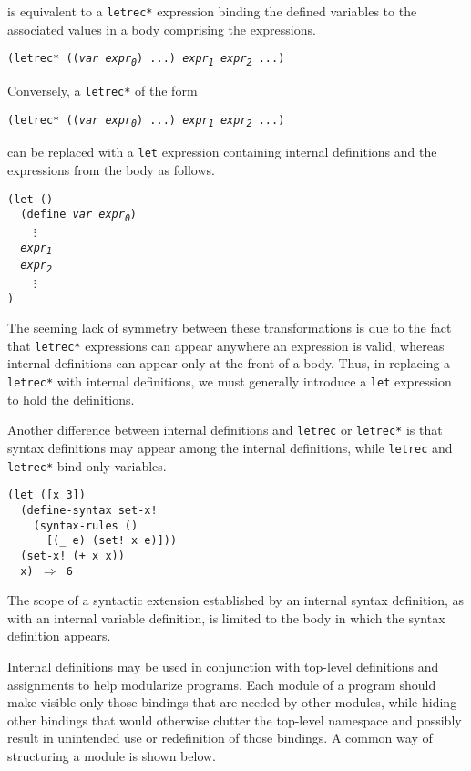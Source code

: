 is equivalent to a \texttt{letrec*}
expression binding the defined variables to the associated values
in a body comprising the expressions.


\texttt{(letrec* ((\textit{var} \textit{expr\textsubscript{0}}) ...) \textit{expr\textsubscript{1}} \textit{expr\textsubscript{2}} ...)}

Conversely, a \texttt{letrec*} of the form


\texttt{(letrec* ((\textit{var} \textit{expr\textsubscript{0}}) ...) \textit{expr\textsubscript{1}} \textit{expr\textsubscript{2}} ...)}

can be replaced with a \texttt{let} expression containing internal definitions
and the expressions from the body as follows.


\begin{alltt}
(let ()
  (define \textit{var} \textit{expr\textsubscript{0}})
    \(\vdots\)
  \textit{expr\textsubscript{1}}
  \textit{expr\textsubscript{2}}
    \(\vdots\)
)
\end{alltt}


The seeming lack of symmetry between these transformations is due to
the fact that \texttt{letrec*} expressions can appear anywhere an expression
is valid, whereas internal definitions can appear only at the front
of a body.
Thus, in replacing a \texttt{letrec*} with internal definitions, we must generally
introduce a \texttt{let} expression to hold the definitions.


Another difference between internal definitions and \texttt{letrec} or
\texttt{letrec*} is that syntax definitions may appear among the internal
definitions, while \texttt{letrec} and \texttt{letrec*} bind only
variables.


\begin{alltt}
(let ([x 3])
  (define-syntax set-x!
    (syntax-rules ()
      [(\_{} e) (set! x e)]))
  (set-x! (+ x x))
  x) \(\Rightarrow\) 6
\end{alltt}


The scope of a syntactic extension established by an internal syntax
definition, as with an internal variable definition, is limited to
the body in which the syntax definition appears.


Internal definitions may be used in conjunction with top-level
definitions and assignments to help modularize programs.
Each module of a program should make visible only those bindings
that are needed by other modules, while hiding other bindings that
would otherwise clutter the top-level namespace and possibly
result in unintended use or redefinition of those bindings.
A common way of structuring a module is shown below.


